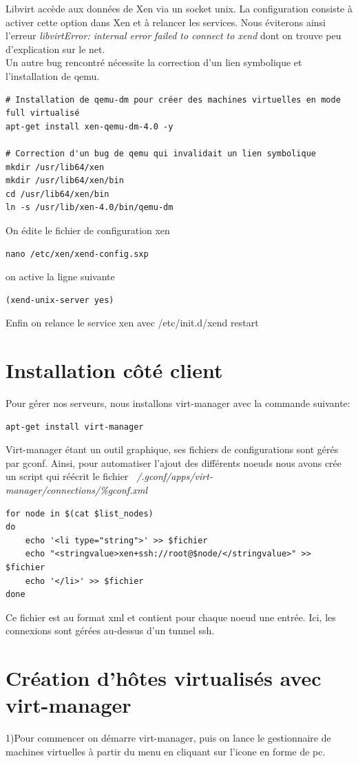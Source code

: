 Libvirt accède aux données de Xen via un socket unix. La configuration consiste à activer cette option dans Xen et à relancer les services.
Nous éviterons ainsi l’erreur \emph{libvirtError: internal error failed to connect to xend} dont on trouve peu d’explication sur le net.
\\
Un autre bug rencontré nécessite la correction d'un lien symbolique et l'installation de qemu.

\begin{lstlisting}
# Installation de qemu-dm pour créer des machines virtuelles en mode full virtualisé
apt-get install xen-qemu-dm-4.0 -y

# Correction d'un bug de qemu qui invalidait un lien symbolique
mkdir /usr/lib64/xen
mkdir /usr/lib64/xen/bin
cd /usr/lib64/xen/bin
ln -s /usr/lib/xen-4.0/bin/qemu-dm
\end{lstlisting} 

On édite le fichier de configuration xen
\begin{lstlisting} 
nano /etc/xen/xend-config.sxp
\end{lstlisting}
 on active la ligne suivante
\begin{lstlisting} 
(xend-unix-server yes)
\end{lstlisting}
 Enfin on relance le service xen avec /etc/init.d/xend restart

\section{Installation côté client}
Pour gérer nos serveurs, nous installons virt-manager avec la commande suivante:
\begin{lstlisting} 
apt-get install virt-manager
\end{lstlisting}
Virt-manager étant un outil graphique, ses fichiers de configurations sont gérés par gconf. Ainsi, pour automatiser l'ajout des différents noeuds nous avons crée un script qui réécrit le fichier \emph{~/.gconf/apps/virt-manager/connections/\%gconf.xml}
\begin{lstlisting}
for node in $(cat $list_nodes)
do
    echo '<li type="string">' >> $fichier
    echo "<stringvalue>xen+ssh://root@$node/</stringvalue>" >> $fichier
    echo '</li>' >> $fichier
done
\end{lstlisting}
Ce fichier est au format xml et contient pour chaque noeud une entrée. Ici, les connexions sont gérées au-dessus d'un tunnel ssh.
\section{Création d'hôtes virtualisés avec virt-manager}
1)Pour commencer on démarre virt-manager, puis on lance le gestionnaire de machines virtuelles à partir du menu en cliquant sur l'icone en forme de pc.

